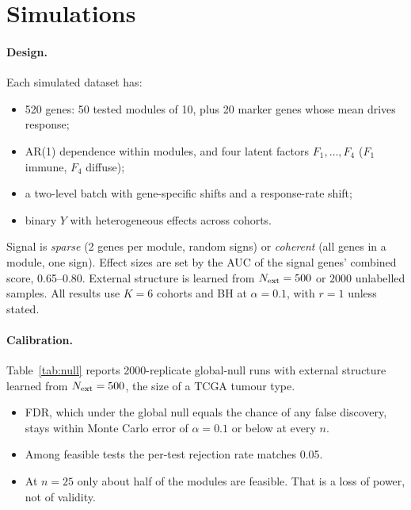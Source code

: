 \documentclass[10pt,twocolumn,letterpaper]{article}
\theoremstyle{remark}
\begin{document}
\section{Simulations}\label{sec:sims}

\paragraph{Design.} Each simulated dataset has:
\begin{itemize}
  \item 520 genes: 50 tested modules of 10, plus 20 marker genes whose mean drives response;
  \item AR(1) dependence within modules, and four latent factors $F_1,\dots,F_4$ ($F_1$ immune, $F_4$ diffuse);
  \item a two-level batch with gene-specific shifts and a response-rate shift;
  \item binary $Y$ with heterogeneous effects across cohorts.
\end{itemize}
Signal is \emph{sparse} (2 genes per module, random signs) or \emph{coherent} (all genes in a module, one sign). Effect sizes are set by the AUC of the signal genes' combined score, 0.65--0.80. External structure is learned from $N_{\rm ext}=500$ or $2000$ unlabelled samples. All results use $K=6$ cohorts and BH at $\alpha=0.1$, with $r=1$ unless stated.

\paragraph{Calibration.} Table~\ref{tab:null} reports 2000-replicate global-null runs with external structure learned from $N_{\rm ext}=500$, the size of a TCGA tumour type.
\begin{itemize}
  \item FDR, which under the global null equals the chance of any false discovery, stays within Monte Carlo error of $\alpha=0.1$ or below at every $n$.
  \item Among feasible tests the per-test rejection rate matches 0.05.
  \item At $n=25$ only about half of the modules are feasible. That is a loss of power, not of validity.
\end{itemize}

\begin{table}[t]
\centering\footnotesize
\caption{Global null with external structure ($N_{\rm ext}=500$): 2000 replicates per row, 95\% intervals.}
\label{tab:null}
\resizebox{\columnwidth}{!}{}
\end{table}
\end{document}
